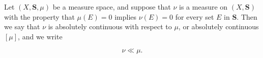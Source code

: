 Let $(X, \mathbf{S}, \mu)$ be a measure space, and suppose that $\nu$ is a measure on $(X, \mathbf{S})$ with the property that $\mu(E) = 0$ implies $\nu(E) = 0$ for every set $E$ in $\mathbf{S}$. Then we say that $\nu$ is absolutely continuous with respect to $\mu$, or absolutely continuous $[\mu]$, and we write

$$\nu \ll \mu.$$
